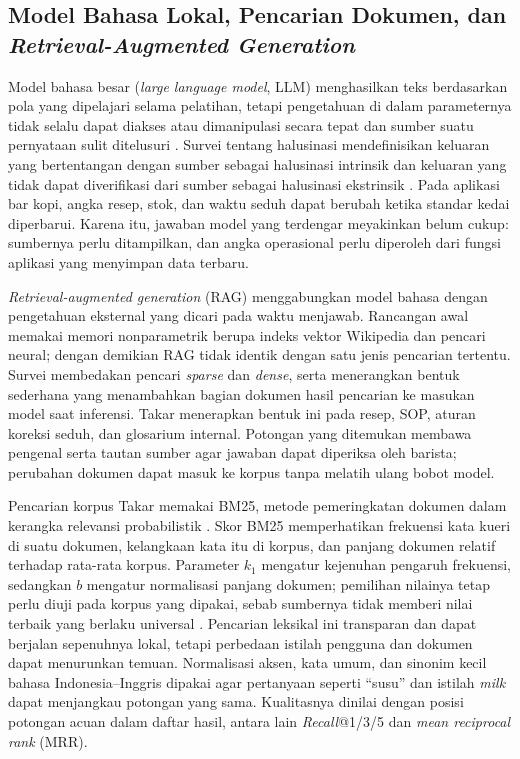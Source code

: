 \subsection{Model Bahasa Lokal, Pencarian Dokumen, dan \texorpdfstring{\textit{Retrieval-Augmented Generation}}{Retrieval-Augmented Generation}}
\label{subsec:llm-rag}

Model bahasa besar (\textit{large language model}, LLM) menghasilkan teks berdasarkan pola yang dipelajari selama pelatihan, tetapi pengetahuan di dalam parameternya tidak selalu dapat diakses atau dimanipulasi secara tepat dan sumber suatu pernyataan sulit ditelusuri \citep{lewis2020retrievalaugmented}. Survei tentang halusinasi mendefinisikan keluaran yang bertentangan dengan sumber sebagai halusinasi intrinsik dan keluaran yang tidak dapat diverifikasi dari sumber sebagai halusinasi ekstrinsik \citep{ji2023survey}. Pada aplikasi bar kopi, angka resep, stok, dan waktu seduh dapat berubah ketika standar kedai diperbarui. Karena itu, jawaban model yang terdengar meyakinkan belum cukup: sumbernya perlu ditampilkan, dan angka operasional perlu diperoleh dari fungsi aplikasi yang menyimpan data terbaru.

\textit{Retrieval-augmented generation} (RAG) menggabungkan model bahasa dengan pengetahuan eksternal yang dicari pada waktu menjawab. Rancangan awal \citet{lewis2020retrievalaugmented} memakai memori nonparametrik berupa indeks vektor Wikipedia dan pencari neural; dengan demikian RAG tidak identik dengan satu jenis pencarian tertentu. Survei \citet{fan2024survey} membedakan pencari \textit{sparse} dan \textit{dense}, serta menerangkan bentuk sederhana yang menambahkan bagian dokumen hasil pencarian ke masukan model saat inferensi. Takar menerapkan bentuk ini pada resep, SOP, aturan koreksi seduh, dan glosarium internal. Potongan yang ditemukan membawa pengenal serta tautan sumber agar jawaban dapat diperiksa oleh barista; perubahan dokumen dapat masuk ke korpus tanpa melatih ulang bobot model.

Pencarian korpus Takar memakai BM25, metode pemeringkatan dokumen dalam kerangka relevansi probabilistik \citep*{robertson2009probabilistic}. Skor BM25 memperhatikan frekuensi kata kueri di suatu dokumen, kelangkaan kata itu di korpus, dan panjang dokumen relatif terhadap rata-rata korpus. Parameter $k_1$ mengatur kejenuhan pengaruh frekuensi, sedangkan $b$ mengatur normalisasi panjang dokumen; pemilihan nilainya tetap perlu diuji pada korpus yang dipakai, sebab sumbernya tidak memberi nilai terbaik yang berlaku universal \citep*{robertson2009probabilistic}. Pencarian leksikal ini transparan dan dapat berjalan sepenuhnya lokal, tetapi perbedaan istilah pengguna dan dokumen dapat menurunkan temuan. Normalisasi aksen, kata umum, dan sinonim kecil bahasa Indonesia--Inggris dipakai agar pertanyaan seperti ``susu'' dan istilah \textit{milk} dapat menjangkau potongan yang sama. Kualitasnya dinilai dengan posisi potongan acuan dalam daftar hasil, antara lain \textit{Recall}@1/3/5 dan \textit{mean reciprocal rank} (MRR).


